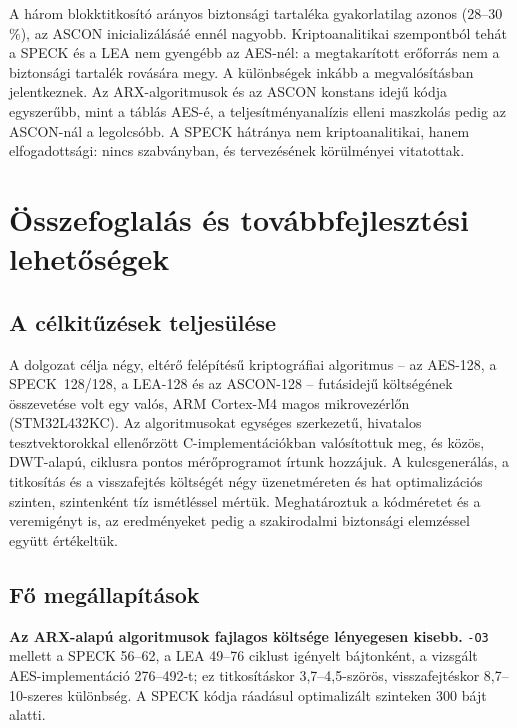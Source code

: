 \documentclass[a4paper,12pt]{report}
\theoremstyle{definition}
\theoremstyle{remark}
\begin{document}
A három blokktitkosító arányos biztonsági tartaléka gyakorlatilag azonos (28--30\,\%), az ASCON inicializálásáé ennél nagyobb. Kriptoanalitikai szempontból tehát a SPECK és a LEA nem gyengébb az AES-nél: a megtakarított erőforrás nem a biztonsági tartalék rovására megy. A különbségek inkább a megvalósításban jelentkeznek. Az ARX-algoritmusok és az ASCON konstans idejű kódja egyszerűbb, mint a táblás AES-é, a teljesítményanalízis elleni maszkolás pedig az ASCON-nál a legolcsóbb. A SPECK hátránya nem kriptoanalitikai, hanem elfogadottsági: nincs szabványban, és tervezésének körülményei vitatottak.

\chapter{Összefoglalás és továbbfejlesztési lehetőségek}\label{chap:osszefoglalas}

\section{A célkitűzések teljesülése}

A dolgozat célja négy, eltérő felépítésű kriptográfiai algoritmus -- az AES-128, a SPECK~128/128, a LEA-128 és az ASCON-128 -- futásidejű költségének összevetése volt egy valós, ARM Cortex-M4 magos mikrovezérlőn (STM32L432KC). Az algoritmusokat egységes szerkezetű, hivatalos tesztvektorokkal ellenőrzött C-implementációkban valósítottuk meg, és közös, DWT-alapú, ciklusra pontos mérőprogramot írtunk hozzájuk. A kulcsgenerálás, a titkosítás és a visszafejtés költségét négy üzenetméreten és hat optimalizációs szinten, szintenként tíz ismétléssel mértük. Meghatároztuk a kódméretet és a veremigényt is, az eredményeket pedig a szakirodalmi biztonsági elemzéssel együtt értékeltük.

\section{Fő megállapítások}

\textbf{Az ARX-alapú algoritmusok fajlagos költsége lényegesen kisebb.} \texttt{-O3} mellett a SPECK 56--62, a LEA 49--76 ciklust igényelt bájtonként, a vizsgált AES-implementáció 276--492-t; ez titkosításkor 3,7--4,5-szörös, visszafejtéskor 8,7--10-szeres különbség. A SPECK kódja ráadásul optimalizált szinteken 300 bájt alatti.
\end{document}
